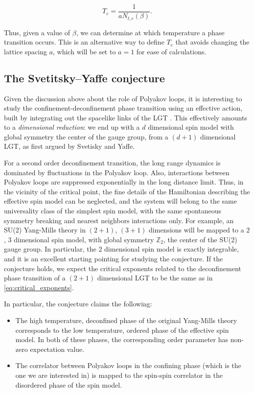 \documentclass[reqno,12pt]{article}
\numberwithin{equation}{section}
\begin{document}
\begin{equation} \label{eq:critical_temperature}
	T_c = \frac{1}{a N_{t,c}(\beta)}.
\end{equation}

Thus, given a value of $\beta$, we can determine at which temperature a phase transition occurs. This is an alternative way
to define $T_c$ that avoids changing the lattice spacing $a$, which will be set to $a = 1$ for ease of calculations. 


\subsection{The Svetitsky–Yaffe conjecture} \label{conjecture}

Given the discussion above about the role of Polyakov loops, it is interesting to study the confinement-deconfinement phase transition
using an effective action, built by integrating out the spacelike links of the LGT \cite{caristo} \cite{caselle}. This effectively
amounts to a \textit{dimensional reduction}: we end up with a $d$ dimensional spin model with global symmetry the center of the
gauge group, from a $(d+1)$ dimensional LGT, as first argued by Svetisky and Yaffe.

For a second order deconfinement transition, the long range dynamics is dominated by fluctuations in the Polyakov loop. Also,
interactions between Polyakov loops are suppressed exponentially in the long distance limit. Thus, in the vicinity of the 
critical point, the fine details of the Hamiltonian describing the effective spin model can be neglected, and the system will belong
to the same universality class of the simplest spin model, with the same spontaneous symmetry breaking and nearest neighbors interactions
only. For example, an SU(2) Yang-Mills theory in $(2+1)$, $(3+1)$ dimensions will be mapped to a $2$, $3$ dimensional spin model, with
global symmetry $\mathbb{Z}_2$, the center of the SU(2) gauge group. In particular, the 2 dimensional spin model is exactly integrable,
and it is an excellent starting pointing for studying the conjecture. If the conjecture holds, we expect
the critical exponents related to the deconfinement phase transition of a $(2+1)$ dimensional LGT to be the same as 
in \eqref{eq:critical_exponents}.

In particular, the conjecture claims the following:
\begin{itemize}
	\item The high temperature, deconfined phase of the original Yang-Mills theory corresponds to the low temperature, ordered phase of 
	the effective spin model. In both of these phases, the corresponding order parameter has non-zero expectation value.

	\item The correlator between Polyakov loops in the confining phase (which is the one we are interested in) is mapped to the spin-spin
	correlator in the disordered phase of the spin model. 
\end{itemize}
\end{document}
